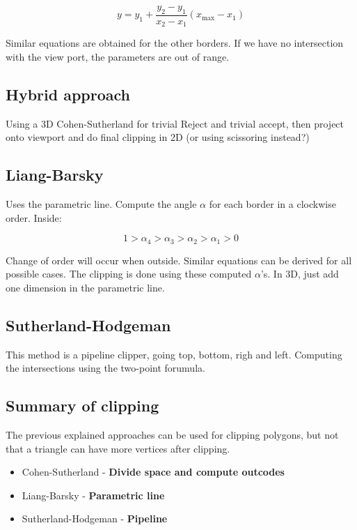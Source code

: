 		\begin{equation}
			y = y_1 + \frac{y_2 - y_1} {x_2-x_1} (x_{\text{max}}-x_1)
		\end{equation}

	Similar equations are obtained for the other borders. If we have no intersection with the view port, the parameters are out of range. 

	\subsection*{Hybrid approach}
	Using a 3D Cohen-Sutherland for trivial Reject and trivial accept, then project onto viewport and do final clipping in 2D (or using scissoring instead?)

	\subsection*{Liang-Barsky}
	Uses the parametric line. Compute the angle $\alpha$ for each border in a clockwise order. Inside:

		\begin{equation}
			1 > \alpha_4 > \alpha_3 > \alpha_2 > \alpha_1 > 0
		\end{equation} 

	Change of order will occur when outside. Similar equations can be derived for all possible cases. The clipping is done using these computed $\alpha$'s. In 3D, just add one dimension in the parametric line.

	\subsection*{Sutherland-Hodgeman}
	This method is a pipeline clipper, going top, bottom, righ and left. Computing the intersections using the two-point forumula. 
	

	\subsection*{Summary of clipping}
	The previous explained approaches can be used for clipping polygons, but not that a triangle can have more vertices after clipping. 

		\begin{itemize}
			\item Cohen-Sutherland - \textbf{Divide space and compute outcodes}
			\item Liang-Barsky - \textbf{Parametric line}
			\item Sutherland-Hodgeman - \textbf{Pipeline}
		\end{itemize}


